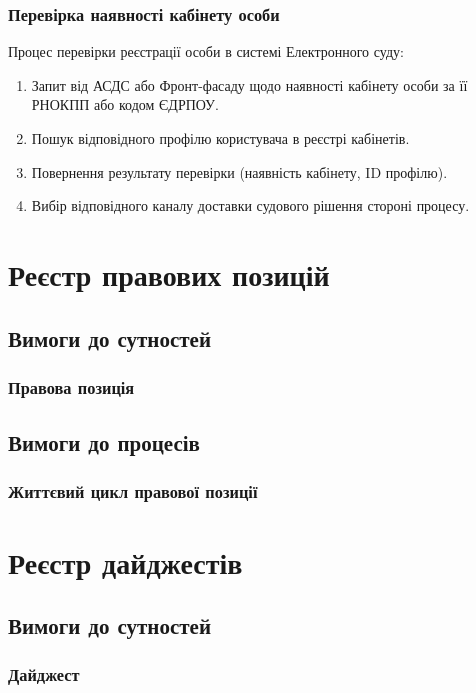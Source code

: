 \documentclass{article}
\begin{document}
\subsubsection{Перевірка наявності кабінету особи}
Процес перевірки реєстрації особи в системі Електронного суду:
\begin{enumerate}
    \item Запит від АСДС або Фронт-фасаду щодо наявності кабінету особи за її РНОКПП або кодом ЄДРПОУ.
    \item Пошук відповідного профілю користувача в реєстрі кабінетів.
    \item Повернення результату перевірки (наявність кабінету, ID профілю).
    \item Вибір відповідного каналу доставки судового рішення стороні процесу.
\end{enumerate}

\newpage
\section{Реєстр правових позицій}

\subsection{Вимоги до сутностей}

\subsubsection{Правова позиція}

\subsection{Вимоги до процесів}

\subsubsection{Життєвий цикл правової позиції}

\newpage
\section{Реєстр дайджестів}

\subsection{Вимоги до сутностей}

\subsubsection{Дайджест}
\end{document}
